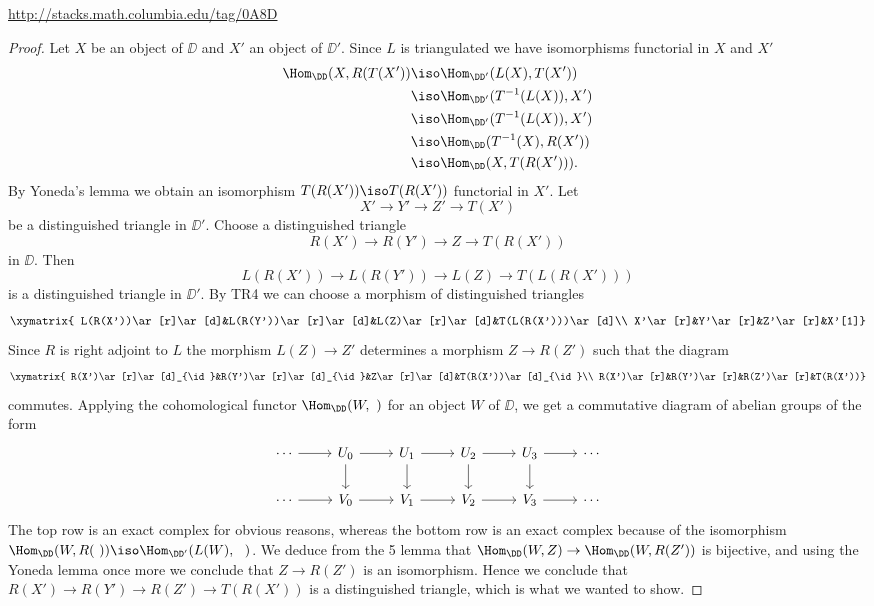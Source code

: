 \documentclass[12pt]{article}
\theoremstyle{remark}
\theoremstyle{definition}
\begin{document}
\centerline{\href{http://stacks.math.columbia.edu/tag/0A8D}{http://stacks.math.columbia.edu/tag/0A8D}}

\begin{proof}
Let $X$ be an object of $\DD$ and $X'$ an object of $\DD'$. Since $L$ is triangulated we have isomorphisms functorial in $X$ and $X'$
\begin{align*}
\Hom_\DD(X,R(T(X'))
&\iso\Hom_{\DD'}(L(X),T(X'))\\
&\iso\Hom_{\DD'}(T^{-1}(L(X)),X')\\
&\iso\Hom_{\DD'}(T^{-1}(L(X)),X')\\
&\iso\Hom_\DD(T^{-1}(X),R(X'))\\
&\iso\Hom_\DD(X,T(R(X'))).
\end{align*}
By Yoneda's lemma we obtain an isomorphism $T(R(X'))\iso T(R(X'))$ functorial in $X'$. Let $$X'\to Y'\to Z'\to T(X')$$ be a distinguished triangle in $\DD'$. Choose a distinguished triangle $$R(X')\to R(Y')\to Z\to T(R(X'))$$ in $\DD$. Then $$L(R(X'))\to L(R(Y'))\to L(Z)\to T(L(R(X')))$$ is a distinguished triangle in $\DD'$. By TR4 we can choose a morphism of distinguished triangles
$$
\xymatrix{
L(R(X'))\ar[r]\ar[d]&L(R(Y'))\ar[r]\ar[d]&L(Z)\ar[r]\ar[d]&T(L(R(X')))\ar[d]\\
X'\ar[r]&Y'\ar[r]&Z'\ar[r]&X'[1]}
$$
Since $R$ is right adjoint to $L$ the morphism $L(Z)\to Z'$ determines a morphism $Z \to R(Z')$ such that the diagram
$$
\xymatrix{
R(X')\ar[r]\ar[d]_{\id}&R(Y')\ar[r]\ar[d]_{\id}&Z\ar[r]\ar[d]&T(R(X'))\ar[d]_{\id}\\
R(X')\ar[r]&R(Y')\ar[r]&R(Z')\ar[r]&T(R(X'))}
$$
commutes. Applying the cohomological functor $\Hom_\DD(W,\ )$ for an object $W$ of $\DD$, we get a commutative diagram of abelian groups of the form 
$$
\begin{tikzcd}
\cdots\ar[r]&U_0\ar[d]\ar[r]&U_1\ar[d]\ar[r]&U_2\ar[d]\ar[r]&U_3\ar[d]\ar[r]&\cdots\\ 
\cdots\ar[r]&V_0\ar[r]&V_1\ar[r]&V_2\ar[r]&V_3\ar[r]&\cdots
\end{tikzcd}
$$ 
The top row is an exact complex for obvious reasons, whereas the bottom row is an exact complex because of the isomorphism $\Hom_\DD(W,R(\ ))\iso\Hom_{\DD'}(L(W),\ \ )$. We deduce from the 5 lemma that $\Hom_\DD(W,Z)\to\Hom_\DD(W,R(Z'))$ is bijective, and using the Yoneda lemma once more we conclude that $Z\to R(Z')$ is an isomorphism. Hence we conclude that $R(X')\to R(Y')\to R(Z')\to T(R(X'))$ is a distinguished triangle, which is what we wanted to show.
\end{proof}
\end{document}
